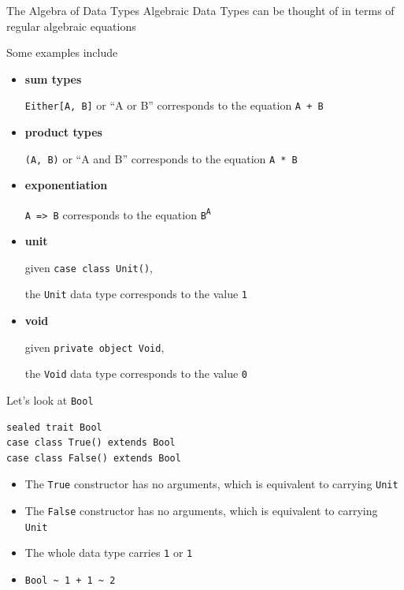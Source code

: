 \begin{frame}
\begin{block}{The Algebra of Data Types}
Algebraic Data Types can be thought of in terms of regular algebraic equations
\end{block}
\end{frame}

\begin{frame}
\begin{block}{Some examples include}
\begin{itemize}
  \item<1-> \textbf{sum types}

            \lstinline{Either[A, B]} or ``A or B'' corresponds to the equation \lstinline{A + B}
  \item<2-> \textbf{product types}

            \lstinline{(A, B)} or ``A and B'' corresponds to the equation \lstinline{A * B}
  \item<3-> \textbf{exponentiation}

            \lstinline{A => B} corresponds to the equation \lstinline{B}\textsuperscript{\lstinline{A}}
  \item<4-> \textbf{unit}

            given \lstinline{case class Unit()},

            the \lstinline{Unit} data type corresponds to the value \lstinline{1}
  \item<5-> \textbf{void}

            given \lstinline{private object Void},

            the \lstinline{Void} data type corresponds to the value \lstinline{0}
\end{itemize}
\end{block}
\end{frame}

\begin{frame}[fragile]
\begin{block}{Let's look at \lstinline{Bool}}
\begin{lstlisting}[style=scala]
sealed trait Bool
case class True() extends Bool
case class False() extends Bool
\end{lstlisting}
\begin{itemize}
  \item<1-> The \lstinline{True} constructor has no arguments, which is equivalent to carrying \lstinline{Unit}
  \item<1-> The \lstinline{False} constructor has no arguments, which is equivalent to carrying \lstinline{Unit}
  \item<2-> The whole data type carries \lstinline{1} or \lstinline{1}
  \item<2-> \lstinline{Bool ~ 1 + 1 ~ 2}
\end{itemize}
\end{block}
\end{frame}

